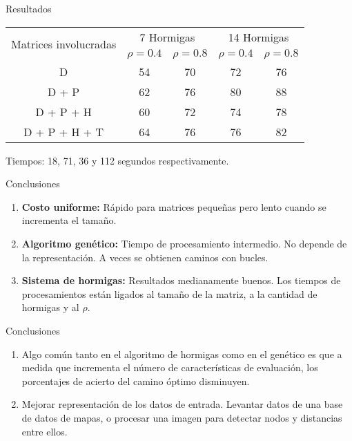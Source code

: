 \documentclass{beamer}
\begin{document}
\begin{frame}{Resultados}
\begin{tabular}[c]{ccccc} \toprule
\multirow{2}{*}{Matrices involucradas}
& \multicolumn{2}{c}{7 Hormigas} 
& \multicolumn{2}{c}{14 Hormigas} \\
& $\rho=0.4$ & $\rho=0.8$ & $\rho=0.4$ & $\rho=0.8$ \\  \midrule
D             & 54 & 70 & 72 & 76 \\
D + P         & 62 & 76 & 80 & 88 \\
D + P + H     & 60 & 72 & 74 & 78 \\
D + P + H + T & 64 & 76 & 76 & 82 \\ \bottomrule    
\end{tabular}
\vfill
Tiempos: 18, 71, 36 y 112 segundos respectivamente.
\end{frame}
\begin{frame}{Conclusiones}
\begin{block}{}
\begin{enumerate}
\item \textbf{Costo uniforme:} Rápido para matrices pequeñas pero lento cuando se incrementa el tamaño.
\item \textbf{Algoritmo genético:} Tiempo de procesamiento intermedio. No depende de la representación. A veces se obtienen caminos con bucles.
\item \textbf{Sistema de hormigas:} Resultados medianamente buenos. Los tiempos de procesamientos están ligados al tamaño de la matriz, a la cantidad de hormigas y al $\rho$.
\end{enumerate}
\end{block}
\end{frame}
\begin{frame}{Conclusiones}
\begin{block}{}
\begin{enumerate}
\item Algo común tanto en el algoritmo de hormigas como en el genético es que a medida que incrementa el número de características de evaluación, los porcentajes de acierto del camino óptimo disminuyen.
\item Mejorar representación de los datos de entrada. Levantar datos de una base de datos de mapas, o procesar una imagen para detectar nodos y distancias entre ellos.
\end{enumerate}
\end{block}
\end{frame}
\end{document}
